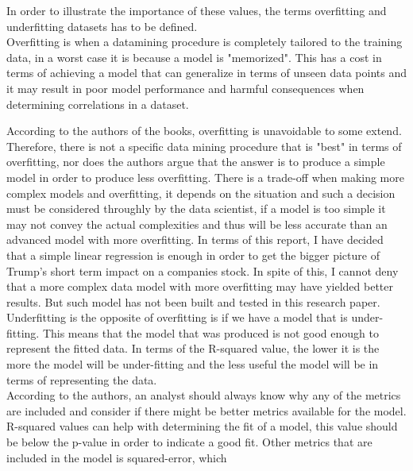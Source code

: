 \documentclass[11pt]{article}
\begin{document}
In order to illustrate the importance of these values, the terms overfitting and underfitting  datasets has to be defined. \\

Overfitting is when a datamining procedure is completely tailored to the training data, in a worst case it is because a model is "memorized". This has a cost in terms of achieving a model that can generalize in terms of unseen data points and it may result in poor model performance and harmful consequences when determining correlations in a dataset. 

According to the authors of the books, overfitting is unavoidable to some extend. Therefore, there is not a specific data mining procedure that is "best" in terms of overfitting, nor does the authors argue that the answer is to produce a simple model in order to produce less overfitting. There is a trade-off when making more complex models and overfitting, it depends on the situation and such a decision must be considered throughly by the data scientist, if a model is too simple it may not convey the actual complexities and thus will be less accurate than an advanced model with more overfitting. In terms of this report, I have decided that a simple linear regression is enough in order to get the bigger picture of Trump's short term impact on a companies stock. In spite of this, I cannot deny that a more complex data model with more overfitting may have yielded better results. But such model has not been built and tested in this research paper. \\


Underfitting is the opposite of overfitting is if we have a model that is under-fitting. This means that the model that was produced is not good enough to represent the fitted data.  In terms of the R-squared value, the lower it is the more the model will be under-fitting and the less useful the model will be in terms of representing the data. \\

According to the authors, an analyst should always know why any of the metrics are included and consider if there might be better metrics available for the model.
R-squared values can help with determining the fit of a model, this value should be below the p-value in order to indicate a good fit. Other metrics that are included in the model is squared-error, which 
\end{document}
